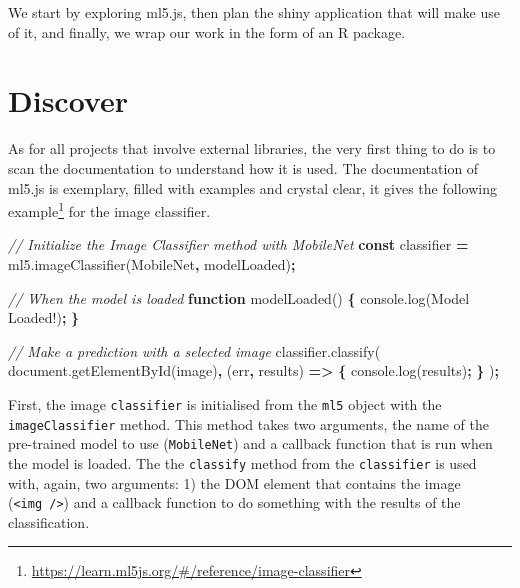 \documentclass[
  10pt,
]{krantz}
\makeatletter
\newenvironment{Shaded}{\begin{snugshade}}{\end{snugshade}}
\newcommand{\AttributeTok}[1]{\textcolor[rgb]{0.61,0.61,0.61}{#1}}
\newcommand{\CommentTok}[1]{\textcolor[rgb]{0.37,0.37,0.37}{\textit{#1}}}
\newcommand{\KeywordTok}[1]{\textcolor[rgb]{0.27,0.27,0.27}{\textbf{#1}}}
\newcommand{\NormalTok}[1]{#1}
\newcommand{\OperatorTok}[1]{\textcolor[rgb]{0.43,0.43,0.43}{\textbf{#1}}}
\newcommand{\StringTok}[1]{\textcolor[rgb]{0.5,0.5,0.5}{#1}}
\newcommand{\VariableTok}[1]{\textcolor[rgb]{0,0,0}{#1}}
\renewcommand{\href}[2]{#2\footnote{\url{#1}}}
\newenvironment{kframe}{%
\medskip{}
\setlength{\fboxsep}{.8em}
 \def\at@end@of@kframe{}%
 \ifinner\ifhmode%
  \def\at@end@of@kframe{\end{minipage}}%
  \begin{minipage}{\columnwidth}%
 \fi\fi%
 \def\FrameCommand##1{\hskip\@totalleftmargin \hskip-\fboxsep
 \colorbox{shadecolor}{##1}\hskip-\fboxsep
     \hskip-\linewidth \hskip-\@totalleftmargin \hskip\columnwidth}%
 \MakeFramed {\advance\hsize-\width
   \@totalleftmargin\z@ \linewidth\hsize
   \@setminipage}}%
 {\par\unskip\endMakeFramed%
 \at@end@of@kframe}
\renewenvironment{Shaded}{\begin{kframe}}{\end{kframe}}
\makeatother
\begin{document}
We start by exploring ml5.js, then plan the shiny application that will make use of it, and finally, we wrap our work in the form of an R package.

\hypertarget{shiny-complete-discover}{%
\section{Discover}\label{shiny-complete-discover}}

As for all projects that involve external libraries, the very first thing to do is to scan the documentation to understand how it is used. The documentation of ml5.js is exemplary, filled with examples and crystal clear, \href{https://learn.ml5js.org/\#/reference/image-classifier}{it gives the following example} for the image classifier.

\begin{Shaded}
\begin{Highlighting}[]
\CommentTok{// Initialize the Image Classifier method with MobileNet}
\KeywordTok{const}\NormalTok{ classifier }\OperatorTok{=} \VariableTok{ml5}\NormalTok{.}\AttributeTok{imageClassifier}\NormalTok{(}\StringTok{\textquotesingle{}MobileNet\textquotesingle{}}\OperatorTok{,}\NormalTok{ modelLoaded)}\OperatorTok{;}

\CommentTok{// When the model is loaded}
\KeywordTok{function} \AttributeTok{modelLoaded}\NormalTok{() }\OperatorTok{\{}
  \VariableTok{console}\NormalTok{.}\AttributeTok{log}\NormalTok{(}\StringTok{\textquotesingle{}Model Loaded!\textquotesingle{}}\NormalTok{)}\OperatorTok{;}
\OperatorTok{\}}

\CommentTok{// Make a prediction with a selected image}
\VariableTok{classifier}\NormalTok{.}\AttributeTok{classify}\NormalTok{(}
  \VariableTok{document}\NormalTok{.}\AttributeTok{getElementById}\NormalTok{(}\StringTok{\textquotesingle{}image\textquotesingle{}}\NormalTok{)}\OperatorTok{,}\NormalTok{ (err}\OperatorTok{,}\NormalTok{ results) }\KeywordTok{=>} \OperatorTok{\{}
    \VariableTok{console}\NormalTok{.}\AttributeTok{log}\NormalTok{(results)}\OperatorTok{;}
  \OperatorTok{\}}
\NormalTok{)}\OperatorTok{;}
\end{Highlighting}
\end{Shaded}

First, the image \texttt{classifier} is initialised from the \texttt{ml5} object with the \texttt{imageClassifier} method. This method takes two arguments, the name of the pre-trained model to use (\texttt{MobileNet}) and a callback function that is run when the model is loaded. The the \texttt{classify} method from the \texttt{classifier} is used with, again, two arguments: 1) the DOM element that contains the image (\texttt{\textless{}img\ /\textgreater{}}) and a callback function to do something with the results of the classification.
\end{document}
